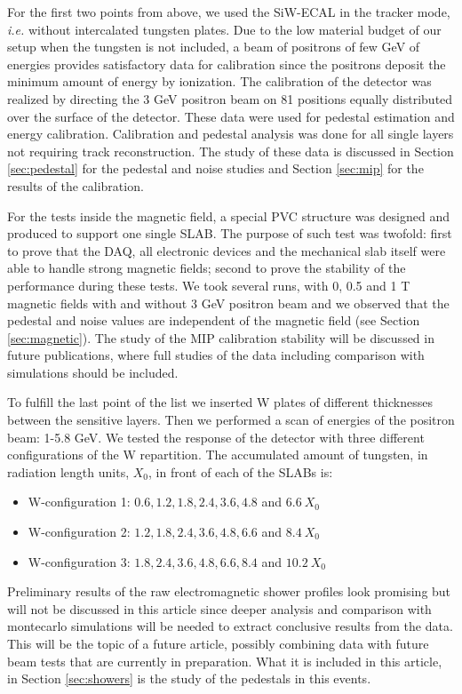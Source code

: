 \documentclass[a4paper,11pt]{article}
\begin{document}
For the first two points from above, we used the SiW-ECAL in the tracker mode, {\it i.e.} without 
intercalated tungsten plates. Due to the low material budget of our setup when the tungsten is not 
included, a beam of positrons of few GeV of energies provides satisfactory data for calibration since 
the positrons deposit the minimum amount of energy by ionization.
The calibration of the detector was realized 
by directing the 3 GeV positron beam on 81 positions equally distributed over the surface of the 
detector.
These data were used for pedestal estimation and energy calibration.
Calibration and pedestal analysis was done for all single layers not requiring track reconstruction.
The study of these data is discussed in Section \ref{sec:pedestal} for the pedestal and noise studies and Section \ref{sec:mip} for the results of the calibration.

For the tests inside the magnetic field, a special PVC structure was
designed and produced to support one single SLAB.
The purpose of such test was twofold: first to prove that the DAQ, all electronic devices and the 
mechanical slab itself were able
to handle strong magnetic fields; second to prove the stability of the performance during these tests.
We took several runs, with 0, 0.5 and 1 T magnetic fields with and without 3 GeV positron beam and 
we observed that the pedestal and noise values are independent of the magnetic field (see Section 
\ref{sec:magnetic}). The study of the MIP calibration stability will be discussed in future 
publications, where full studies of the data including comparison with simulations should be included.

To fulfill the last point of the list we inserted W plates of different thicknesses between the 
sensitive layers. Then we performed
a scan of energies of the positron beam: 1-5.8 GeV.
We tested the response of the detector with three different configurations of the W repartition.
The accumulated amount of tungsten, in radiation length units, $X_{0}$, in front of each of the 
SLABs is:
\begin{itemize}
\item W-configuration 1: $0.6,1.2,1.8,2.4,3.6,4.8$ and $6.6~X_{0}$
\item W-configuration 2: $1.2,1.8,2.4,3.6,4.8,6.6$ and $8.4~X_{0}$
\item W-configuration 3: $1.8,2.4,3.6,4.8,6.6,8.4$ and $10.2~X_{0}$
\end{itemize}

Preliminary results of the raw electromagnetic shower profiles look promising but will not be 
discussed in this article since deeper analysis and comparison with montecarlo simulations
will be needed to extract conclusive results from the data. This will be the topic of a future 
article, possibly combining data with future beam tests that are currently in preparation. What it
is included in this article, in Section \ref{sec:showers} is the study of the pedestals in this events.
\end{document}
